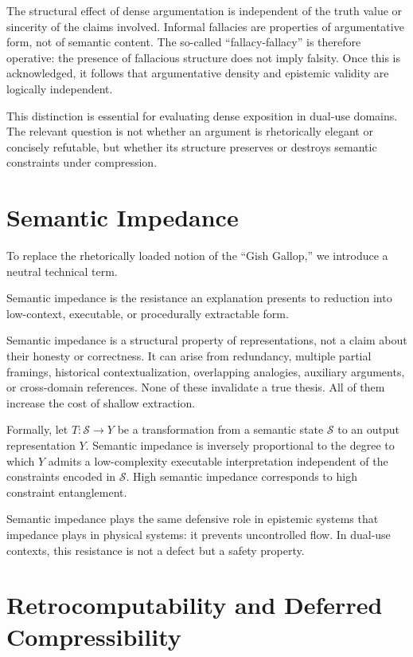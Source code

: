 The structural effect of dense argumentation is independent of the truth value or sincerity of the claims involved. Informal fallacies are properties of argumentative form, not of semantic content. The so-called ``fallacy-fallacy'' is therefore operative: the presence of fallacious structure does not imply falsity. Once this is acknowledged, it follows that argumentative density and epistemic validity are logically independent.

This distinction is essential for evaluating dense exposition in dual-use domains. The relevant question is not whether an argument is rhetorically elegant or concisely refutable, but whether its structure preserves or destroys semantic constraints under compression.

\section{Semantic Impedance}
\label{sec:impedance}

To replace the rhetorically loaded notion of the ``Gish Gallop,'' we introduce a neutral technical term.

\begin{definition}
Semantic impedance is the resistance an explanation presents to reduction into low-context, executable, or procedurally extractable form.
\end{definition}

Semantic impedance is a structural property of representations, not a claim about their honesty or correctness. It can arise from redundancy, multiple partial framings, historical contextualization, overlapping analogies, auxiliary arguments, or cross-domain references. None of these invalidate a true thesis. All of them increase the cost of shallow extraction.

Formally, let $T : \mathcal{S} \to Y$ be a transformation from a semantic state $\mathcal{S}$ to an output representation $Y$. Semantic impedance is inversely proportional to the degree to which $Y$ admits a low-complexity executable interpretation independent of the constraints encoded in $\mathcal{S}$. High semantic impedance corresponds to high constraint entanglement.

Semantic impedance plays the same defensive role in epistemic systems that impedance plays in physical systems: it prevents uncontrolled flow. In dual-use contexts, this resistance is not a defect but a safety property.

\section{Retrocomputability and Deferred Compressibility}
\label{sec:retro}

